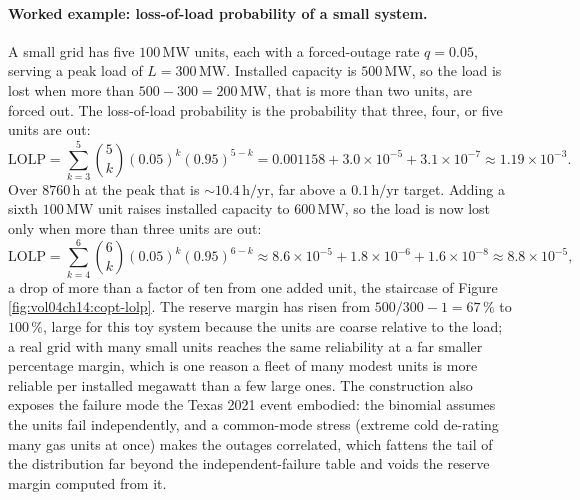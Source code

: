 \paragraph{Worked example: loss-of-load probability of a small system.} A
small grid has five $100\,\si{\mega\watt}$ units, each with a forced-outage
rate $q = 0.05$, serving a peak load of $L = 300\,\si{\mega\watt}$. Installed
capacity is $500\,\si{\mega\watt}$, so the load is lost when more than $500 -
300 = 200\,\si{\mega\watt}$, that is more than two units, are forced out. The
loss-of-load probability is the probability that three, four, or five units
are out:
\[
\text{LOLP} = \sum_{k=3}^{5} \binom{5}{k} (0.05)^k (0.95)^{5-k}
= 0.001158 + 3.0\times 10^{-5} + 3.1\times 10^{-7}
\approx 1.19\times 10^{-3}.
\]
Over $8760\,\si{\hour}$ at the peak that is $\sim 10.4\,\si{\hour}/\text{yr}$,
far above a $0.1\,\si{\hour}/\text{yr}$ target. Adding a sixth $100\,\si{\mega
\watt}$ unit raises installed capacity to $600\,\si{\mega\watt}$, so the load
is now lost only when more than three units are out:
\[
\text{LOLP} = \sum_{k=4}^{6} \binom{6}{k} (0.05)^k (0.95)^{6-k}
\approx 8.6\times 10^{-5} + 1.8\times 10^{-6} + 1.6\times 10^{-8}
\approx 8.8\times 10^{-5},
\]
a drop of more than a factor of ten from one added unit, the staircase of
Figure \ref{fig:vol04ch14:copt-lolp}. The reserve margin has risen from
$500/300 - 1 = 67\,\%$ to $100\,\%$, large for this toy system because the
units are coarse relative to the load; a real grid with many small units
reaches the same reliability at a far smaller percentage margin, which is one
reason a fleet of many modest units is more reliable per installed megawatt
than a few large ones. The construction also exposes the failure mode the
Texas 2021 event \cite{acc:ferc-nerc-texas-2021} embodied: the binomial
assumes the units fail independently, and a common-mode stress (extreme cold
de-rating many gas units at once) makes the outages correlated, which fattens
the tail of the distribution far beyond the independent-failure table and
voids the reserve margin computed from it.

